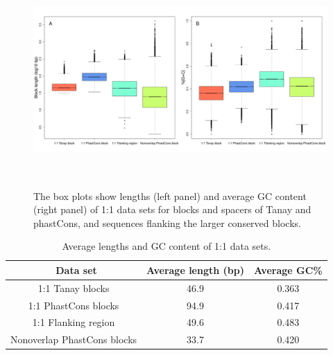 \documentclass[12pt]{report}
\begin{document}
\begin{figure}[htbp]
\centering
\includegraphics[width=\textwidth, height=82mm]{nonexonic_1_1_GC_lengths}
\caption{The box plots show lengths (left panel) and average GC content (right panel) of 1:1 data sets for blocks and spacers of Tanay and phastCons, and sequences flanking the larger conserved blocks.}
\label{fig:1_1_base_comp}
\end{figure}

\begin{table}[ht]
\centering
\begin{tabular}{c c c}
\hline\hline
\ Data set & Average length (bp) & Average GC\% \\ [0.5ex]
\hline
1:1 Tanay blocks & 46.9 & 0.363 \\
1:1 PhastCons blocks & 94.9 & 0.417 \\
1:1 Flanking region & 49.6 & 0.483 \\
Nonoverlap PhastCons blocks & 33.7 & 0.420 \\ [1ex]
\hline
\end{tabular}
\caption[Caption for LOF]{\centering Average lengths and GC content of 1:1 data sets.}
\end{table}
\end{document}
